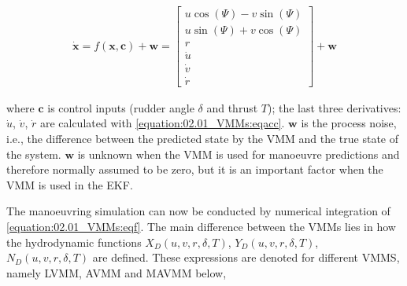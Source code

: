 \documentclass[review]{elsarticle}
\begin{document}
\begin{equation}\label{equation:02.01_VMMs:eqf}
\begin{split}\displaystyle \dot{\mathbf{x}} = f(\mathbf{x},\mathbf{c}) + \mathbf{w} = \left[\begin{matrix}u \cos{\left(\Psi \right)} - v \sin{\left(\Psi \right)}\\u \sin{\left(\Psi \right)} + v \cos{\left(\Psi \right)}\\r\\\dot{u}\\\dot{v}\\\dot{r}\end{matrix}\right] + \mathbf{w}\end{split}
\end{equation}

where \(\mathbf{c}\) is control inputs (rudder angle \(\delta\) and thrust $T$); the last three derivatives: \(\dot{u}\), \(\dot{v}\), \(\dot{r}\) are calculated with \autoref{equation:02.01_VMMs:eqacc}. \(\mathbf{w}\) is the  process noise, i.e., the difference between the predicted state by the VMM and the true state of the system. \(\mathbf{w}\) is unknown when the VMM is used for manoeuvre predictions and therefore normally assumed to be zero, but it is an important factor when the VMM is used in the EKF.


\sphinxAtStartPar
The manoeuvring simulation can now be conducted by numerical integration of \autoref{equation:02.01_VMMs:eqf}. The main difference between the VMMs lies in how the hydrodynamic functions \(X_D(u,v,r,\delta,T)\), \(Y_D(u,v,r,\delta,T)\), \(N_D(u,v,r,\delta,T)\) are defined. These expressions are denoted for different VMMS, namely LVMM, AVMM and MAVMM below,
\end{document}
